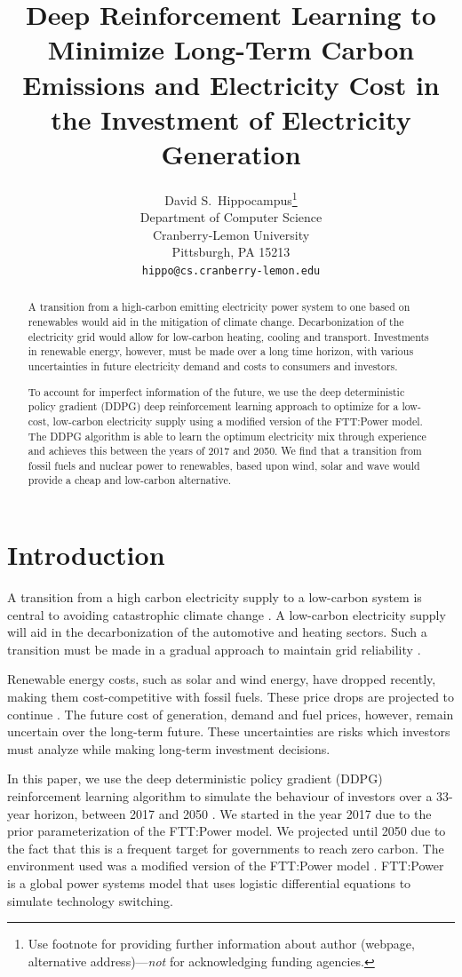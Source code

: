 \documentclass{article}
\title{Deep Reinforcement Learning to Minimize Long-Term Carbon Emissions and Electricity Cost in the Investment of Electricity Generation}
\author{%
  David S.~Hippocampus\thanks{Use footnote for providing further information
    about author (webpage, alternative address)---\emph{not} for acknowledging
    funding agencies.} \\
  Department of Computer Science\\
  Cranberry-Lemon University\\
  Pittsburgh, PA 15213 \\
  \texttt{hippo@cs.cranberry-lemon.edu} \\
}
\begin{document}
\maketitle

\begin{abstract}

A transition from a high-carbon emitting electricity power system to one based on renewables would aid in the mitigation of climate change. Decarbonization of the electricity grid would allow for low-carbon heating, cooling and transport. Investments in renewable energy, however, must be made over a long time horizon, with various uncertainties in future electricity demand and costs to consumers and investors. 

To account for imperfect information of the future, we use the deep deterministic policy gradient (DDPG) deep reinforcement learning approach to optimize for a low-cost, low-carbon electricity supply using a modified version of the FTT:Power model. The DDPG algorithm is able to learn the optimum electricity mix through experience and achieves this between the years of 2017 and 2050. We find that a transition from fossil fuels and nuclear power to renewables, based upon wind, solar and wave would provide a cheap and low-carbon alternative.

\end{abstract}




\section{Introduction}
\label{sec:intro}


A transition from a high carbon electricity supply to a low-carbon system is central to avoiding catastrophic climate change \cite{Kell2020}. A low-carbon electricity supply will aid in the decarbonization of the automotive and heating sectors. Such a transition must be made in a gradual approach to maintain grid reliability \cite{Kahrl2011}.

Renewable energy costs, such as solar and wind energy, have dropped recently, making them cost-competitive with fossil fuels. These price drops are projected to continue \cite{IEA2015}. The future cost of generation, demand and fuel prices, however, remain uncertain over the long-term future. These uncertainties are risks which investors must analyze while making long-term investment decisions.

In this paper, we use the deep deterministic policy gradient (DDPG) reinforcement learning algorithm to simulate the behaviour of investors over a 33-year horizon, between 2017 and 2050 \cite{Hunt2016a}. We started in the year 2017 due to the prior parameterization of the FTT:Power model. We projected until 2050 due to the fact that this is a frequent target for governments to reach zero carbon. The environment used was a modified version of the FTT:Power model \cite{Mercure2012}. FTT:Power is a global power systems model that uses logistic differential equations to simulate technology switching. 
\end{document}
